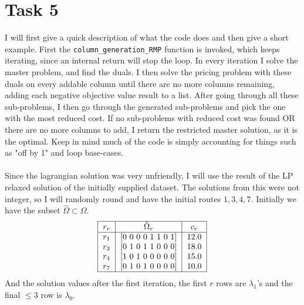 \documentclass{article}
\begin{document}
    \section{Task 5}
    I will first give a quick description of what the code does and then give a short example.
    First the \texttt{column\_generation\_RMP} function is invoked, which keeps iterating, since an internal return will stop the loop.
    In every iteration I solve the master problem, and find the duals.
    I then solve the pricing problem with these duals on every addable column until there are no more columns remaining, adding each negative objective value result to a list.
    After going through all these sub-problems, I then go through the generated sub-problems and pick the one with the most reduced cost.
    If no sub-problems with reduced cost was found OR there are no more columns to add, I return the restricted master solution, as it is the optimal.
    Keep in mind much of the code is simply accounting for things such as "off by 1" and loop base-cases.
    \\\\
    Since the lagrangian solution was very unfriendly, I will use the result of the LP relaxed solution of the initially supplied dataset.
    The solutions from this were not integer, so I will randomly round and have the initial routes $1,3,4,7$.
    Initially we have the subset $\hat{\Omega} \subset \Omega$.
    \[
        \begin{tabular}{ |c| c|c|c|c|c|c|c|c | }
            \hline
            $r_r$ &     $\hat{\Omega}_r$    &  $c_r$ \\
            \hline
            $r_1$ &     [0 0 0 0 1 1 0 1]   &  $12.0$ \\
            $r_3$ &     [0 1 0 1 1 0 0 0]   &  $18.0$ \\
            $r_4$ &     [1 0 1 0 0 0 0 0]   &  $15.0$ \\
            $r_7$ &     [0 1 0 1 0 0 0 0]   &  $10.0$ \\
            \hline
        \end{tabular}
    \]
    And the solution values after the first iteration, the first $r$ rows are $\lambda_1$'s and the final $\leq 3$ row is $\lambda_0$.
\end{document}
